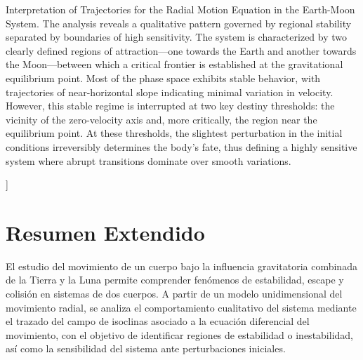 \documentclass[a4paper,10pt,twocolumn]{article}
\begin{document}
\begin{enabstract}

  Interpretation of Trajectories for the Radial Motion Equation in the Earth-Moon System. The analysis reveals a qualitative pattern governed by regional stability separated by boundaries of high sensitivity. The system is characterized by two clearly defined regions of attraction—one towards the Earth and another towards the Moon—between which a critical frontier is established at the gravitational equilibrium point. Most of the phase space exhibits stable behavior, with trajectories of near-horizontal slope indicating minimal variation in velocity. However, this stable regime is interrupted at two key destiny thresholds: the vicinity of the zero-velocity axis and, more critically, the region near the equilibrium point. At these thresholds, the slightest perturbation in the initial conditions irreversibly determines the body's fate, thus defining a highly sensitive system where abrupt transitions dominate over smooth variations.

\end{enabstract}


\vspace{0.8cm} ]



\section{Resumen Extendido}\label{sec:intro}
El estudio del movimiento de un cuerpo bajo la influencia gravitatoria combinada de la Tierra y la Luna permite comprender fenómenos de estabilidad, escape y colisión en sistemas de dos cuerpos. A partir de un modelo unidimensional del movimiento radial, se analiza el comportamiento cualitativo del sistema mediante el trazado del campo de isoclinas asociado a la ecuación diferencial del movimiento, con el objetivo de identificar regiones de estabilidad o inestabilidad, así como la sensibilidad del sistema ante perturbaciones iniciales.
\end{document}
